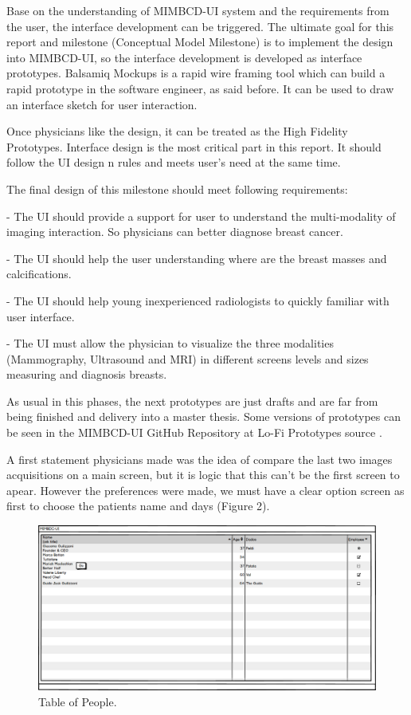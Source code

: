 Base on the understanding of MIMBCD-UI system and the requirements from the user, the interface development can be triggered. The ultimate goal for this report and milestone (Conceptual Model Milestone) is to implement the design into MIMBCD-UI, so the interface development is developed as interface prototypes. Balsamiq Mockups \cite{Balsamiq} is a rapid wire framing tool which can build a rapid prototype in the software engineer, as said before. It can be used to draw an interface sketch for user interaction.

Once physicians like the design, it can be treated as the High Fidelity Prototypes. Interface design is the most critical part in this report. It should follow the UI design n rules and meets user’s need at the same time.

The final design of this milestone should meet following requirements:

- The UI should provide a support for user to understand the multi-modality of imaging interaction. So physicians can better diagnose breast cancer.

- The UI should help the user understanding where are the breast masses and calcifications.

- The UI should help young inexperienced radiologists to quickly familiar with
user interface.

- The UI must allow the physician to visualize the three modalities (Mammography, Ultrasound and MRI) in different screens levels and sizes measuring and diagnosis breasts.

As usual in this phases, the next prototypes are just drafts and are far from being finished and delivery into a master thesis. Some versions of prototypes can be seen in the MIMBCD-UI GitHub Repository at Lo-Fi Prototypes source \cite{mimbcdUILoFiPrototypes}.

\clearpage

A first statement physicians made was the idea of compare the last two images acquisitions on a main screen, but it is logic that this can't be the first screen to apear. However the preferences were made, we must have a clear option screen as first to choose the patients name and days (Figure 2).

\begin{figure}[!hbt]
\centering
\includegraphics[width=1.00\textwidth]{tabela_pessoas.png}
\caption{\label{PT}Table of People.
}
\end{figure}

